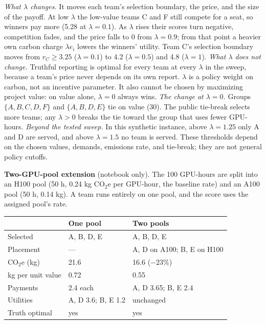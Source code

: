 \emph{What $\lambda$ changes.} It moves each team's selection boundary, the price, and the size of the payoff. At low $\lambda$ the low-value teams C and F still compete for a seat, so winners pay more (5.28 at $\lambda=0.1$). As $\lambda$ rises their scores turn negative, competition fades, and the price falls to 0 from $\lambda=0.9$; from that point a heavier own carbon charge $\lambda e_i$ lowers the winners' utility. Team C's selection boundary moves from $r_C\ge3.25$ ($\lambda=0.1$) to 4.2 ($\lambda=0.5$) and 4.8 ($\lambda=1$).
\emph{What $\lambda$ does not change.} Truthful reporting is optimal for every team at every $\lambda$ in the sweep, because a team's price never depends on its own report. $\lambda$ is a policy weight on carbon, not an incentive parameter. It also cannot be chosen by maximizing project value: on value alone, $\lambda=0$ always wins.
\emph{The change at $\lambda=0$.} Groups $\{A,B,C,D,F\}$ and $\{A,B,D,E\}$ tie on value (30). The public tie-break selects more teams; any $\lambda>0$ breaks the tie toward the group that uses fewer GPU-hours.
\emph{Beyond the tested sweep.} In this synthetic instance, above $\lambda=1.25$ only A and D are served, and above $\lambda=1.5$ no team is served. These thresholds depend on the chosen values, demands, emissions rate, and tie-break; they are not general policy cutoffs.

\textbf{Two-GPU-pool extension} (notebook only). The 100 GPU-hours are split into an H100 pool (50 h, 0.24 kg CO$_2$e per GPU-hour, the baseline rate) and an A100 pool (50 h, 0.14 kg). A team runs entirely on one pool, and the score uses the assigned pool's rate.

\begin{center}
\footnotesize\setlength{\tabcolsep}{3pt}
\begin{tabularx}{\columnwidth}{@{}p{2.3cm}YY@{}}
\toprule
 & One pool & Two pools \\
\midrule
Selected & A, B, D, E & A, B, D, E \\
Placement & --- & A, D on A100; B, E on H100 \\
CO$_2$e (kg) & 21.6 & 16.6 ($-23\%$) \\
kg per unit value & 0.72 & 0.55 \\
Payments & 2.4 each & A, D 3.65; B, E 2.4 \\
Utilities & A, D 3.6; B, E 1.2 & unchanged \\
Truth optimal & yes & yes \\
\bottomrule
\end{tabularx}
\end{center}

